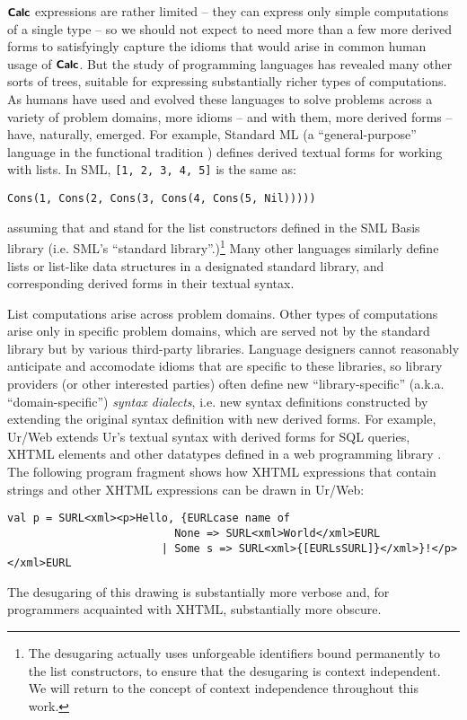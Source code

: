 $\textsf{\textbf{\small Calc}}$ expressions are rather limited -- they can express only simple computations of a single type -- so we should not expect to need more than a few more derived forms  to satisfyingly capture the  idioms that would arise in common human usage of $\textsf{\textbf{\small Calc}}$. %
But the study of programming languages has revealed many other sorts of trees, suitable for expressing substantially richer types of computations.  As humans have used and evolved these languages to solve problems across a variety of problem domains, more idioms -- and with them, more derived forms -- have, naturally, emerged.  For example, Standard ML (a ``general-purpose''  language in the functional tradition \cite{mthm97-for-dart,harper1997programming}) defines derived textual forms for working with lists. In SML, \lstinline{[1, 2, 3, 4, 5]} is the same as: 
\begin{lstlisting}[numbers=none]
Cons(1, Cons(2, Cons(3, Cons(4, Cons(5, Nil)))))
\end{lstlisting}
assuming that  and  stand for the list constructors defined in the SML Basis library (i.e. SML's ``standard library''.)\footnote{The desugaring actually uses unforgeable identifiers bound permanently to the list constructors, to ensure that the desugaring is context independent. We will return to the concept of context independence throughout this work.} Many other languages similarly define lists or list-like data structures in a designated standard library, and corresponding derived forms in their textual syntax.

List computations arise across problem domains. Other types of computations arise only in specific problem domains, which are served not by the standard library but by various third-party libraries. Language designers cannot reasonably anticipate and accomodate idioms that are specific to these libraries, so  library providers (or other interested parties) often define new ``library-specific'' (a.k.a. ``domain-specific'') \emph{syntax dialects}, i.e. new syntax definitions constructed by extending the original syntax definition with new derived forms. For example, Ur/Web extends Ur's textual syntax with derived forms for SQL queries, XHTML elements and other datatypes defined in a  web programming library \cite{conf/popl/Chlipala15}. The  following program fragment shows how XHTML expressions that contain strings and other XHTML expressions can be drawn in Ur/Web: %
\begin{lstlisting}[numbers=none]
val p = SURL<xml><p>Hello, {EURLcase name of
                          None => SURL<xml>World</xml>EURL
                        | Some s => SURL<xml>{[EURLsSURL]}</xml>}!</p></xml>EURL
\end{lstlisting}                              
The desugaring of this drawing is substantially more verbose and, for programmers  acquainted with XHTML, substantially more obscure.

